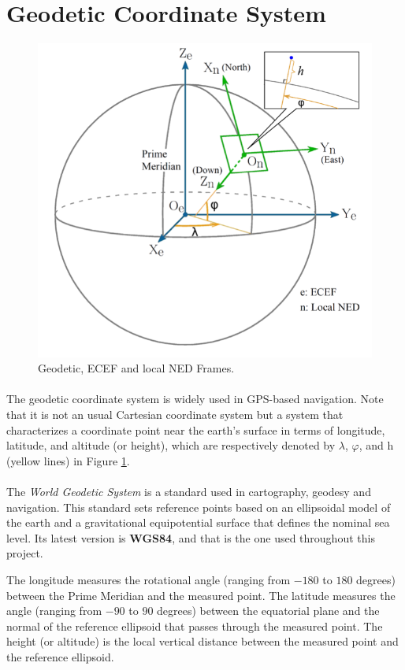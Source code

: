 \section{Geodetic Coordinate System}\label{sec:geodetic}

\begin{figure}[H]
   \centering
    \includegraphics[width=.70\textwidth]{figures/GeoTemp1.png} 
    \caption{Geodetic, ECEF and local NED Frames.}  
    \label{fig:Geodetic1}
\end{figure}

\paragraph{}The geodetic coordinate system is widely used in GPS-based navigation. Note that it is not an usual Cartesian coordinate system but a system that characterizes a coordinate point near the earth’s surface in terms of longitude, latitude, and altitude (or height), which are respectively denoted by $\lambda$, $\varphi$, and h (yellow lines) in Figure \ref{fig:Geodetic1}.

\paragraph{}The \textit{World Geodetic System} is a standard used in cartography, geodesy and navigation. This standard sets reference points based on an ellipsoidal model of the earth and a gravitational equipotential surface that defines the nominal sea level. Its latest version is \textbf{WGS84}, and that is the one used throughout this project. 

The longitude measures the rotational angle (ranging from $-180$ to $180$ degrees) between the Prime Meridian and the measured point. The latitude measures the angle (ranging from $-90$ to $90$ degrees) between the equatorial plane and the normal of the reference ellipsoid that passes through the measured point. The height (or altitude) is the local vertical distance between the measured point and the reference ellipsoid.

